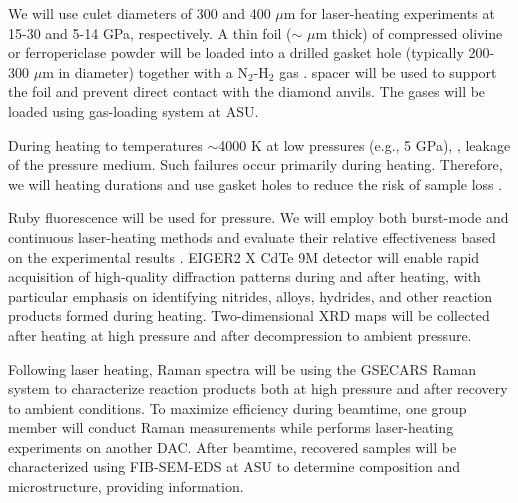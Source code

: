 We will use  culet diameters of 300 and 400 $\mu$m for laser-heating experiments at 15-30 and 5-14 GPa, respectively. 
A thin foil ($\sim$ $\mu$m thick) of compressed olivine or ferropericlase powder will be loaded into a drilled gasket hole (typically 200-300 $\mu$m in diameter) together with a N$_2$-H$_2$ gas . 
 spacer will be used to support the foil and prevent direct contact with the diamond anvils. 
The gases will be loaded using  gas-loading system at ASU.

During heating to  temperatures  \deleted{(}$\sim$4000 K\deleted{)} at  low pressures (e.g., 5 GPa), ,  leakage of the pressure medium. 
Such failures  occur primarily during  heating. 
Therefore, we will  heating durations and use  gasket holes  to reduce the risk of  sample loss .

Ruby fluorescence will be used for  pressure. 
We will employ both burst-mode and continuous laser-heating methods and evaluate their relative effectiveness based on the experimental results . 
 EIGER2 X CdTe 9M detector  will enable rapid acquisition of high-quality diffraction patterns during and after heating, with particular emphasis on identifying nitrides,  alloys, hydrides, and other reaction products formed during heating. 
Two-dimensional XRD maps will be collected after heating at high pressure and  after decompression to ambient pressure.

Following  laser heating, Raman spectra will be  using the GSECARS Raman system to characterize reaction products both at high pressure and after recovery to ambient conditions. 
To maximize efficiency during beamtime, one group member will conduct Raman measurements while  performs laser-heating experiments on another DAC. 
After beamtime,  recovered samples will be characterized using  FIB-SEM-EDS  at ASU to determine composition and microstructure, providing  information.

